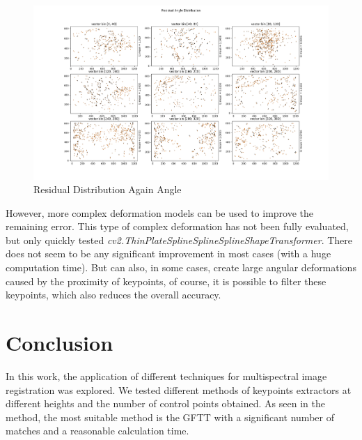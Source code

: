 \documentclass[]{elsarticle}
\begin{document}
	\begin{figure}[!htb]
		\centering
		\includegraphics[width=\linewidth]{../figures/perspective-features-residual.png}
		\caption{Residual Distribution Again Angle}
		\label{fig:residual-angle}
	\end{figure}
	
	However, more complex deformation models \cite{10.1007/978-3-642-3-3-33709-3_3} can be used to improve the remaining error.
	This type of complex deformation has not been fully evaluated, but only quickly tested \textit{cv2.ThinPlateSplineSplineSplineShapeTransformer}.
	There does not seem to be any significant improvement in most cases (with a huge computation time).
	But can also, in some cases, create large angular deformations caused by the proximity of keypoints,
	of course, it is possible to filter these keypoints, which also reduces the overall accuracy.
	
	
	\section{Conclusion}
	
	In this work, the application of different techniques for multispectral image registration was explored.
	We tested different methods of keypoints extractors at different heights and the number of control points obtained.
	As seen in the method, the most suitable method is the GFTT with a significant number of matches and a reasonable calculation time.
	
\end{document}
